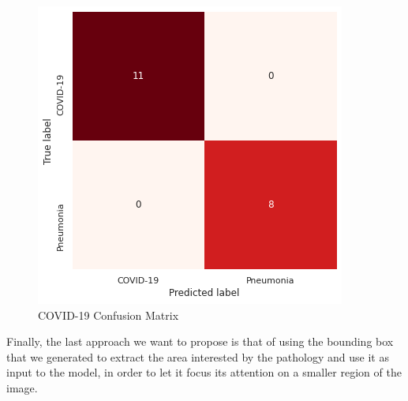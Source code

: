 \vspace{5mm}

\begin{figure}[htbp!]
\centering
\includegraphics[scale=0.62]{Tesi/images/COVID CM.png}
\caption{COVID-19 Confusion Matrix}
\label{fig:figure_6.1}
\end{figure}

\newpage
\vspace{5mm}
Finally, the last approach we want to propose is that of using the bounding box that we generated to extract the area interested by the pathology and use it as input to the model, in order to let it focus its attention on a smaller region of the image.

